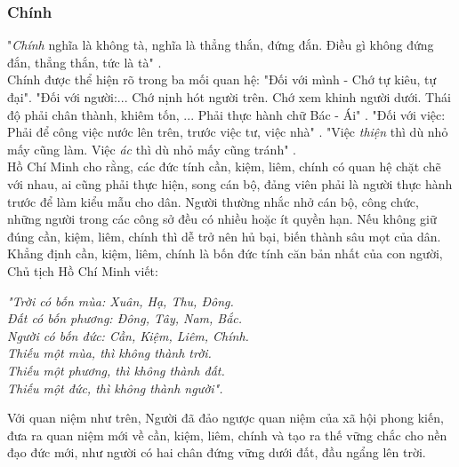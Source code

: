 \subsubsection{Chính}
"\textit{Chính} nghĩa là không tà, nghĩa là thẳng thắn, đứng đắn. Điều gì không đứng đắn, thẳng thắn, tức là tà" \cite{HCMtt6}.\\
Chính được thể hiện rõ trong ba mối quan hệ: "Đối với mình - Chớ tự kiêu, tự đại". "Đối với người:... Chớ nịnh hót người trên. Chớ xem khinh người dưới. Thái độ phải chân thành, khiêm tốn, ... Phải thực hành chữ Bác - Ái" \cite{HCMtt6}. "Đối với việc: Phải để công việc nước lên trên, trước việc tư, việc nhà" \cite{HCMtt6}. "Việc \textit{thiện} thì dù nhỏ mấy cũng làm. Việc \textit{ác} thì dù nhỏ mấy cũng tránh" \cite{HCMtt6}.\\
Hồ Chí Minh cho rằng, các đức tính cần, kiệm, liêm, chính có quan hệ chặt chẽ với nhau, ai cũng phải thực hiện, song cán bộ, đảng viên phải là người thực hành trước để làm kiểu mẫu cho dân. Người thường nhắc nhở cán bộ, công chức, những người trong các công sở đều có nhiều hoặc ít quyền hạn. Nếu không giữ đúng cần, kiệm, liêm, chính thì dễ trở nên hủ bại, biến thành sâu mọt của dân. \cite{syllabus}\\
Khẳng định cần, kiệm, liêm, chính là bốn đức tính căn bản nhất của con người, Chủ tịch Hồ Chí Minh viết:
\begin{center}
\textit{"Trời có bốn mùa: Xuân, Hạ, Thu, Đông.\\
Đất có bốn phương: Đông, Tây, Nam, Bắc.\\
Người có bốn đức: Cần, Kiệm, Liêm, Chính.\\
Thiếu một mùa, thì không thành trời.\\
Thiếu một phương, thì không thành đất.\\
Thiếu một đức, thì không thành người"\cite{HCMtt5}.}
\end{center}
Với quan niệm như trên, Người đã đảo ngược quan niệm của xã hội phong kiến, đưa ra quan niệm mới về cần, kiệm, liêm, chính và tạo ra thế vững chắc cho nền đạo đức mới, như người có hai chân đứng vững dưới đất, đầu ngẩng lên trời. \cite{soiduong}

